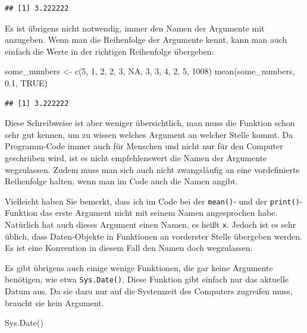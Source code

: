 \documentclass[
]{book}
\newenvironment{Shaded}{\begin{snugshade}}{\end{snugshade}}
\newcommand{\ConstantTok}[1]{\textcolor[rgb]{0.00,0.00,0.00}{#1}}
\newcommand{\DecValTok}[1]{\textcolor[rgb]{0.00,0.00,0.81}{#1}}
\newcommand{\FloatTok}[1]{\textcolor[rgb]{0.00,0.00,0.81}{#1}}
\newcommand{\FunctionTok}[1]{\textcolor[rgb]{0.00,0.00,0.00}{#1}}
\newcommand{\NormalTok}[1]{#1}
\newcommand{\OtherTok}[1]{\textcolor[rgb]{0.56,0.35,0.01}{#1}}
\begin{document}
\begin{verbatim}
## [1] 3.222222
\end{verbatim}

Es ist übrigens nicht notwendig, immer den Namen der Argumente mit anzugeben. Wenn man die Reihenfolge der Argumente kennt, kann man auch einfach die Werte in der richtigen Reihenfolge übergeben:

\begin{Shaded}
\begin{Highlighting}[]
\NormalTok{some\_numbers }\OtherTok{\textless{}{-}} \FunctionTok{c}\NormalTok{(}\DecValTok{5}\NormalTok{, }\DecValTok{1}\NormalTok{, }\DecValTok{2}\NormalTok{, }\DecValTok{2}\NormalTok{, }\DecValTok{3}\NormalTok{, }\ConstantTok{NA}\NormalTok{, }\DecValTok{3}\NormalTok{, }\DecValTok{3}\NormalTok{, }\DecValTok{4}\NormalTok{, }\DecValTok{2}\NormalTok{, }\DecValTok{5}\NormalTok{, }\DecValTok{1008}\NormalTok{)}
\FunctionTok{mean}\NormalTok{(some\_numbers, }\FloatTok{0.1}\NormalTok{, }\ConstantTok{TRUE}\NormalTok{)}
\end{Highlighting}
\end{Shaded}

\begin{verbatim}
## [1] 3.222222
\end{verbatim}

Diese Schreibweise ist aber weniger übersichtlich, man muss die Funktion schon sehr gut kennen, um zu wissen welches Argument an welcher Stelle kommt. Da Programm-Code immer auch für Menschen und nicht nur für den Computer geschriiben wird, ist es nicht empfehlenswert die Namen der Argumente wegzulassen. Zudem muss man sich auch nicht zwangsläufig an eine vordefinierte Reihenfolge halten, wenn man im Code auch die Namen angibt.

Vielleicht haben Sie bemerkt, dass ich im Code bei der \texttt{mean()}- und der \texttt{print()}-Funktion das erste Argument nicht mit seinem Namen angesprochen habe. Natürlich hat auch dieses Argument einen Namen, es heißt \texttt{x}. Jedoch ist es sehr üblich, dass Daten-Objekte in Funktionen an vorderster Stelle übergeben werden. Es ist eine Konvention in diesem Fall den Namen doch wegzulassen.

Es gibt übrigens auch einige wenige Funktionen, die gar keine Argumente benötigen, wie etwa \texttt{Sys.Date()}. Diese Funktion gibt einfach nur das aktuelle Datum aus. Da sie dazu nur auf die Systemzeit des Computers zugreifen muss, braucht sie kein Argument.

\begin{Shaded}
\begin{Highlighting}[]
\FunctionTok{Sys.Date}\NormalTok{()}
\end{Highlighting}
\end{Shaded}
\end{document}
